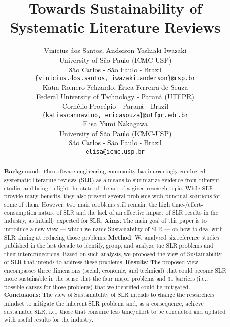 \documentclass{article}
\title{Towards Sustainability of Systematic Literature Reviews
}
\author{
  Vinicius dos Santos, Anderson Yoshiaki Iwazaki \\
  University of São Paulo (ICMC-USP) \\
  São Carlos - São Paulo - Brazil\\
  \texttt{\{vinicius.dos.santos, iwazaki.anderson\}@usp.br} \\
   \And
  Katia Romero Felizardo, Érica Ferreira de Souza \\
  Federal University of Technology - Paran\'a (UTFPR) \\
  Cornélio Procópio - Paraná - Brazil \\
  \texttt{\{katiascannavino, ericasouza\}@utfpr.edu.br} \\
  \And
  Elisa Yumi Nakagawa \\
  University of São Paulo (ICMC-USP) \\
  São Carlos - São Paulo - Brazil\\
  \texttt{elisa@icmc.usp.br} \\
}
\begin{document}
\maketitle


\begin{abstract}

\textbf{Background}: The software engineering community has increasingly conducted systematic literature reviews (SLR) as a means to summarize evidence from different studies and bring to light the state of the art of a given research topic. While SLR provide many benefits, they also present several problems with punctual solutions for some of them. However, two main problems still remain: the high time-/effort-consumption nature of SLR and the lack of an effective impact of SLR results in the industry, as initially expected for SLR. \textbf{Aims}: The main goal of this paper is to introduce a new view --- which we name Sustainability of SLR --- on how to deal with SLR aiming at reducing those problems. \textbf{Method}: We analyzed six reference studies published in the last decade to identify, group, and analyze the SLR problems and their interconnections. Based on such analysis, we proposed the view of  Sustainability of SLR that intends to address these problems. \textbf{Results}: The proposed view encompasses three dimensions (social, economic, and technical) that could become SLR more sustainable in the sense that the four major problems and 31 barriers (i.e., possible causes for those problems) that we identified could be mitigated. \textbf{Conclusions:} The view of Sustainability of SLR intends to change the researchers' mindset to mitigate the inherent SLR problems and, as a consequence, achieve sustainable SLR, i.e., those that consume less time/effort to be conducted and updated with useful results for the industry.
\end{abstract}






\end{document}
